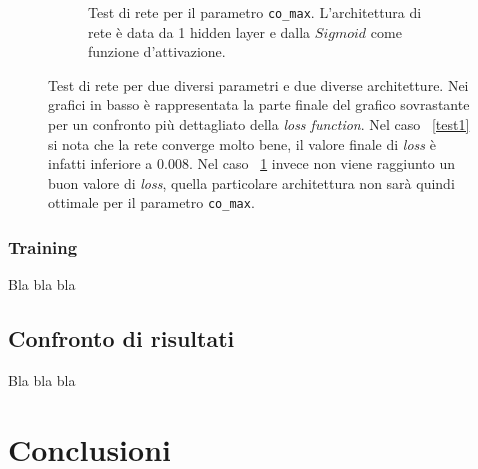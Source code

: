 \documentclass[12pt,a4paper,final]{book}
\begin{document}
\begin{figure}[!ht]
\begin{subfigure}{0.49\textwidth}
		\caption{Test di rete per il parametro \texttt{co\_max}. L'architettura di rete è data da 1 hidden layer e dalla $Sigmoid$ come funzione d'attivazione.}
		\label{test2}
	\end{subfigure}
	\caption{Test di rete per due diversi parametri e due diverse architetture. Nei grafici in basso è rappresentata la parte finale del grafico sovrastante per un confronto più dettagliato della \textit{loss function}. Nel caso ~\ref{test1} si nota che la rete converge molto bene, il valore finale di \textit{loss} è infatti inferiore a $0.008$. Nel caso ~\ref{test2} invece non viene raggiunto un buon valore di \textit{loss}, quella particolare architettura non sarà quindi ottimale per il parametro \texttt{co\_max}.}
	\label{test_rete}
\end{figure}



\subsection{Training}\label{training}
Bla bla bla

\section{Confronto di risultati}\label{risultati}
Bla bla bla 









\chapter{Conclusioni}\label{conclusioni}


\nocite{*}
{}

\end{document}

